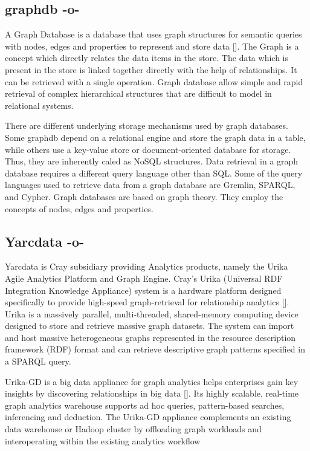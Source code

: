      
\subsection{graphdb -o-}

A Graph Database is a database that uses graph structures for semantic
queries with nodes, edges and properties to represent and store data
 [\cite{www-graphdb}]. The Graph is a concept which directly relates the
data items in the store.  The data which is present in the store is
linked together directly with the help of relationships. It can be
retrieved with a single operation.  Graph database allow simple and
rapid retrieval of complex hierarchical structures that are difficult
to model in relational systems.

There are different underlying storage mechanisms used by graph
databases.  Some graphdb depend on a relational engine and store the
graph data in a table, while others use a key-value store or
document-oriented database for storage. Thus, they are inherently
caled as NoSQL structures.  Data retrieval in a graph database
requires a different query language other than SQL. Some of the query
languages used to retrieve data from a graph database are Gremlin,
SPARQL, and Cypher.  Graph databases are based on graph theory. They
employ the concepts of nodes, edges and properties.


     
\subsection{Yarcdata -o-}

Yarcdata is Cray subsidiary providing Analytics products, namely the
Urika Agile Analytics Platform and Graph Engine. Cray's Urika
(Universal RDF Integration Knowledge Appliance) system is a hardware
platform designed specifically to provide high-speed graph-retrieval
for relationship analytics [\cite{www-Urika-appliance}].  Urika is a
massively parallel, multi-threaded, shared-memory computing device
designed to store and retrieve massive graph datasets. The system can
import and host massive heterogeneous graphs represented in the
resource description framework (RDF) format and can retrieve
descriptive graph patterns specified in a SPARQL query.

Urika-GD is a big data appliance for graph analytics helps enterprises
gain key insights by discovering relationships in big
data [\cite{techspec-Urika-GD}].  Its highly scalable, real-time graph
analytics warehouse supports ad hoc queries, pattern-based searches,
inferencing and deduction. The Urika-GD appliance complements an
existing data warehouse or Hadoop cluster by offloading graph
workloads and interoperating within the existing analytics workflow


